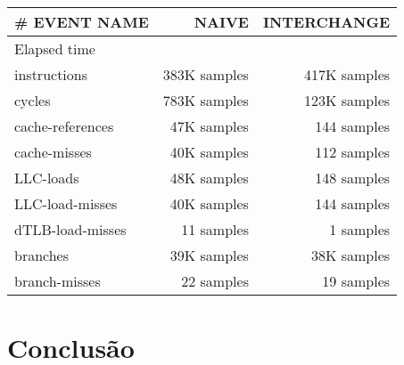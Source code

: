 \documentclass[conference,compsoc]{IEEEtran}
\begin{document}
\begin{itemize}
\begin{table}[H]
\begin{tabular}{ | l | r | r |   }
  \hline
  \# EVENT NAME	 & NAIVE  & INTERCHANGE \\ \hline   
  Elapsed time & &  \\ \hline    
  instructions & 383K samples	& 417K samples  \\ \hline    
cycles	& 783K  samples &  123K samples  \\ \hline    
cache-references &	47K samples & 144 samples   \\ \hline    
cache-misses & 40K samples	& 112 samples \\ \hline    
LLC-loads	 &  48K samples &  148 samples \\ \hline    
LLC-load-misses	& 40K samples & 144 samples  \\ \hline    
dTLB-load-misses	& 11 samples & 1 samples \\ \hline    
branches	&  39K samples &  38K samples \\ \hline    
branch-misses	& 22 samples & 19 samples \\ \hline    
   \end{tabular}
  \end{table}



  \section{Conclusão}


















\end{itemize}
\end{document}
